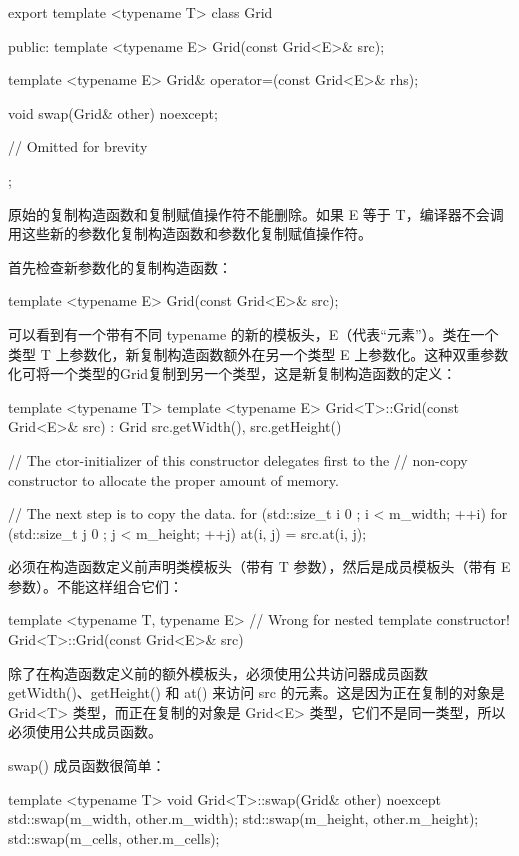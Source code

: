 \begin{cpp}
export template <typename T>
class Grid
{
    public:
        template <typename E>
        Grid(const Grid<E>& src);

        template <typename E>
        Grid& operator=(const Grid<E>& rhs);

        void swap(Grid& other) noexcept;

        // Omitted for brevity
};
\end{cpp}

原始的复制构造函数和复制赋值操作符不能删除。如果 E 等于 T，编译器不会调用这些新的参数化复制构造函数和参数化复制赋值操作符。

首先检查新参数化的复制构造函数：

\begin{cpp}
template <typename E>
Grid(const Grid<E>& src);
\end{cpp}

可以看到有一个带有不同 typename 的新的模板头，E（代表“元素”）。类在一个类型 T 上参数化，新复制构造函数额外在另一个类型 E 上参数化。这种双重参数化可将一个类型的Grid复制到另一个类型，这是新复制构造函数的定义：

\begin{cpp}
template <typename T>
template <typename E>
Grid<T>::Grid(const Grid<E>& src)
    : Grid { src.getWidth(), src.getHeight() }
{
    // The ctor-initializer of this constructor delegates first to the
    // non-copy constructor to allocate the proper amount of memory.

    // The next step is to copy the data.
    for (std::size_t i { 0 }; i < m_width; ++i) {
        for (std::size_t j { 0 }; j < m_height; ++j) {
            at(i, j) = src.at(i, j);
        }
    }
}
\end{cpp}

必须在构造函数定义前声明类模板头（带有 T 参数），然后是成员模板头（带有 E 参数）。不能这样组合它们：

\begin{cpp}
template <typename T, typename E> // Wrong for nested template constructor!
Grid<T>::Grid(const Grid<E>& src)
\end{cpp}

除了在构造函数定义前的额外模板头，必须使用公共访问器成员函数 getWidth()、getHeight() 和 at() 来访问 src 的元素。这是因为正在复制的对象是 Grid<T> 类型，而正在复制的对象是 Grid<E> 类型，它们不是同一类型，所以必须使用公共成员函数。

swap() 成员函数很简单：

\begin{cpp}
template <typename T>
void Grid<T>::swap(Grid& other) noexcept
{
    std::swap(m_width, other.m_width);
    std::swap(m_height, other.m_height);
    std::swap(m_cells, other.m_cells);
}
\end{cpp}

